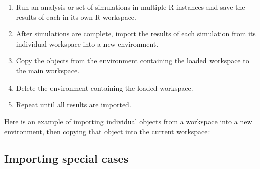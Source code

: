 \documentclass[
  13,
  letterpaper,
]{report}
\newenvironment{Shaded}{\begin{snugshade}}{\end{snugshade}}
\newcommand{\AttributeTok}[1]{\textcolor[rgb]{0.40,0.45,0.13}{#1}}
\newcommand{\CommentTok}[1]{\textcolor[rgb]{0.37,0.37,0.37}{#1}}
\newcommand{\FunctionTok}[1]{\textcolor[rgb]{0.28,0.35,0.67}{#1}}
\newcommand{\NormalTok}[1]{\textcolor[rgb]{0.00,0.23,0.31}{#1}}
\newcommand{\OtherTok}[1]{\textcolor[rgb]{0.00,0.23,0.31}{#1}}
\newcommand{\SpecialCharTok}[1]{\textcolor[rgb]{0.37,0.37,0.37}{#1}}
\newcommand{\StringTok}[1]{\textcolor[rgb]{0.13,0.47,0.30}{#1}}
\begin{document}
\begin{enumerate}
\def\labelenumi{\arabic{enumi}.}
\item
  Run an analysis or set of simulations in multiple R instances and save
  the results of each in its own R workspace.
\item
  After simulations are complete, import the results of each simulation
  from its individual workspace into a new environment.
\item
  Copy the objects from the environment containing the loaded workspace
  to the main workspace.
\item
  Delete the environment containing the loaded workspace.
\item
  Repeat until all results are imported.
\end{enumerate}

Here is an example of importing individual objects from a workspace into
a new environment, then copying that object into the current workspace:

\begin{Shaded}
\end{Shaded}

\subsection{Importing special cases}\label{sec-04-import-special}
\end{document}

